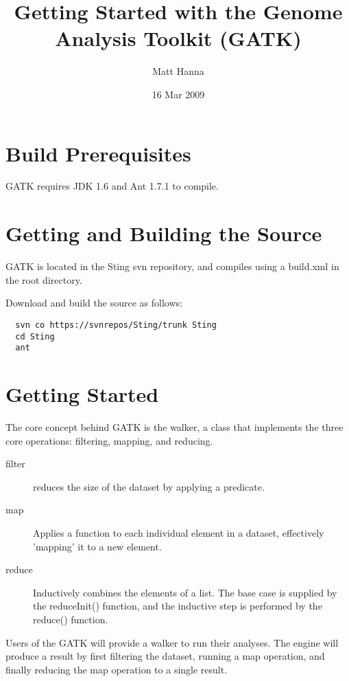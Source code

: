 \documentclass[11pt,fullpage]{article}
\begin{document}
\title{Getting Started with the Genome Analysis Toolkit (GATK)}
\author{Matt Hanna}
\date{16 Mar 2009}
\maketitle

\section{Build Prerequisites}
GATK requires JDK 1.6 and Ant 1.7.1 to compile.

\section{Getting and Building the Source}
GATK is located in the Sting svn repository, and
compiles using a build.xml in the root directory.

Download and build the source as follows:
\begin{verbatim}
  svn co https://svnrepos/Sting/trunk Sting
  cd Sting
  ant
\end{verbatim}

\section{Getting Started}
The core concept behind GATK is the walker, a class that implements the 
three core operations: filtering, mapping, and reducing.

\begin{description}
  \item [filter] reduces the size of the dataset by applying a predicate.  
  \item [map] Applies a function to each individual element in a dataset, 
    effectively 'mapping' it to a new element.
  \item [reduce] Inductively combines the elements of a list.  The base
    case is supplied by the reduceInit() function, and the inductive step
    is performed by the reduce() function.
\end{description}
Users of the GATK will provide a walker to run their analyses.  The engine
will produce a result by first filtering the dataset, running a map operation,
and finally reducing the map operation to a single result.  
\end{document}
